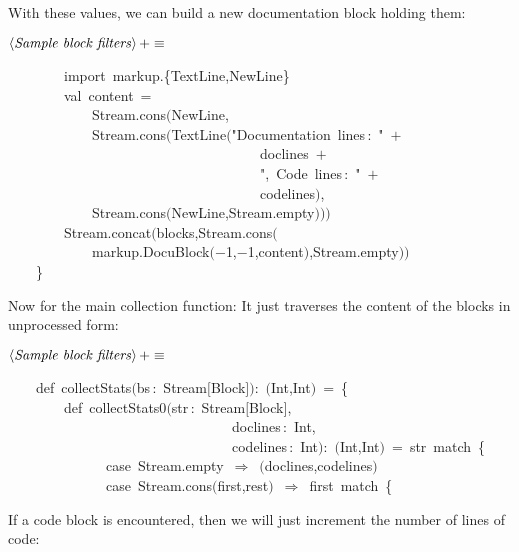 \documentclass[a4paper,12pt]{article}
\begin{document}
With these values, we can build a new documentation block
holding them:

$\left<\mbox{\emph{Sample block filters}}\right>+\equiv$
\begin{program}~~~~~~~~{\vem import}~markup.{\small\{}TextLine,NewLine{\small\}}
\\~~~~~~~~{\vem val}~content~=
\\~~~~~~~~~~~~Stream.cons$($NewLine,
\\~~~~~~~~~~~~Stream.cons$($TextLine$($"Documentation~lines\,{\rm :}~"~$+$
\\~~~~~~~~~~~~~~~~~~~~~~~~~~~~~~~~~~~~doclines~$+$
\\~~~~~~~~~~~~~~~~~~~~~~~~~~~~~~~~~~~~",~Code~lines\,{\rm :}~"~$+$
\\~~~~~~~~~~~~~~~~~~~~~~~~~~~~~~~~~~~~codelines$)$,
\\~~~~~~~~~~~~Stream.cons$($NewLine,Stream.empty$)$$)$$)$
\\~~~~~~~~Stream.concat$($blocks,Stream.cons$($
\\~~~~~~~~~~~~markup.DocuBlock$($$-$1,$-$1,content$)$,Stream.empty$)$$)$
\\~~~~{\small\}}
\\[0.5em]\end{program}


Now for the main collection function: It just traverses the
content of the blocks in unprocessed form:

$\left<\mbox{\emph{Sample block filters}}\right>+\equiv$
\begin{program}~~~~{\vem def}~collectStats$($bs\,{\rm :}~Stream$[$Block$]$$)${\rm :}~$($Int,Int$)$~=~{\small\{}
\\~~~~~~~~{\vem def}~collectStats0$($str\,{\rm :}~Stream$[$Block$]$,
\\~~~~~~~~~~~~~~~~~~~~~~~~~~~~~~~~doclines\,{\rm :}~Int,
\\~~~~~~~~~~~~~~~~~~~~~~~~~~~~~~~~codelines\,{\rm :}~Int$)${\rm :}~$($Int,Int$)$~=~str~{\vem match}~{\small\{}
\\~~~~~~~~~~~~~~{\vem case}~Stream.empty~$\Rightarrow$~$($doclines,codelines$)$
\\~~~~~~~~~~~~~~{\vem case}~Stream.cons$($first,rest$)$~$\Rightarrow$~first~{\vem match}~{\small\{}
\\[0.5em]\end{program}



If a code block is encountered, then we will just increment the
number of lines of code:
\end{document}
